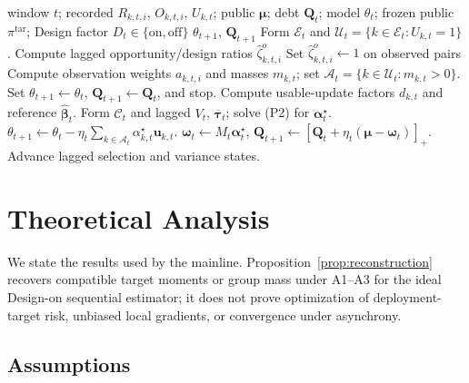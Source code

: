 \documentclass[letterpaper,journal]{IEEEtran}
\begin{document}
\begin{algorithm}[t]
\caption{Window-close RAVEN-MCS with the Design factor as an explicit configuration}
\label{alg:window_close}
\begin{algorithmic}[1]
\REQUIRE window $t$; recorded $R_{k,t,i}$, $O_{k,t,i}$, $U_{k,t}$;
public $\boldsymbol\mu$; debt $\mathbf{Q}_t$; model $\theta_t$;
frozen public $\pi^{\mathrm{tar}}$; Design factor $D_t\in\{\mathrm{on},\mathrm{off}\}$
\ENSURE $\theta_{t+1}$, $\mathbf{Q}_{t+1}$
\STATE Form $\mathcal{E}_t$ and
$\mathcal{U}_t=\{k\in\mathcal{E}_t:U_{k,t}=1\}$.
\STATE Compute lagged opportunity/design ratios
$\widehat\zeta^{o}_{k,t,i}$ 
\ELSE
\STATE Set $\widehat\zeta^{o}_{k,t,i}\leftarrow 1$ on observed pairs 
\ENDIF
\STATE Compute observation weights $a_{k,t,i}$ and masses $m_{k,t}$;
set $\mathcal{A}_t=\{k\in\mathcal{U}_t:m_{k,t}>0\}$.
\STATE Set $\theta_{t+1}\leftarrow\theta_t$,
$\mathbf{Q}_{t+1}\leftarrow\mathbf{Q}_t$, and stop.
\ELSE
\STATE Compute usable-update factors $d_{k,t}$ and reference
$\widehat{\boldsymbol\beta}_t$.
\STATE Form $\mathcal{C}_t$ and lagged $V_t$,
$\overline{\boldsymbol\tau}_t$; solve (P2) for
$\boldsymbol\alpha_t^\star$.
\STATE $\theta_{t+1}\leftarrow\theta_t
-\eta_t\sum_{k\in\mathcal{A}_t}\alpha^\star_{k,t}\mathbf{u}_{k,t}$.
\STATE $\boldsymbol\omega_t\leftarrow M_t\boldsymbol\alpha_t^\star$,
$\mathbf{Q}_{t+1}\leftarrow
[\mathbf{Q}_t+\eta_t(\boldsymbol\mu-\boldsymbol\omega_t)]_+$.
\STATE Advance lagged selection and variance states.
\ENDIF
\end{algorithmic}
\end{algorithm}


\section{Theoretical Analysis}
\label{sec:theory}

We state the results used by the mainline.  Proposition~\ref{prop:reconstruction}
recovers compatible target moments or group mass under A1--A3 for the
ideal Design-on sequential estimator; it does not
prove optimization of deployment-target risk, unbiased local gradients, or
convergence under asynchrony.

\subsection{Assumptions}
\label{subsec:assumptions}
\end{document}
